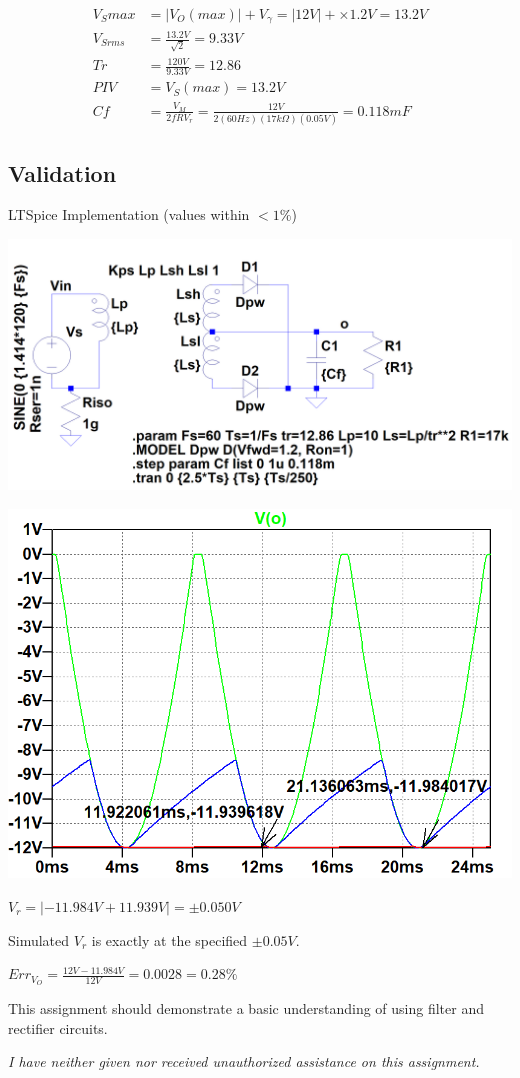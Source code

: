 \documentclass[12pt,letterpaper,titlepage]{article}
\begin{document}
\begin{raggedright}
\begin{align*}
    V_S{max} 
      &= |V_O(max)| + V_\gamma
       = |12V| + \times 1.2V
       = 13.2V
\\  V_{Srms}
	  &= \frac{13.2V}{\sqrt{2}}
	   = 9.33V
\\  Tr
	  &= \frac{120V}{9.33V}
	   = 12.86
\\  PIV
	  &= V_S(max)
	   = 13.2V
\\  Cf
      &= \frac{V_M}{2fRV_r}
       = \frac{12V}{2(60Hz)(17k\Omega)(0.05V)}
       = 0.118mF
\end{align*}


\clearpage
\subsection{Validation}

\begin{center}
LTSpice Implementation (values within $<1\%$)

\includegraphics[width=.75\textwidth, height=\textheight, keepaspectratio=true]{ds2b}

\includegraphics[width=.65\textwidth, height=\textheight, keepaspectratio=true]{ds2c}

$V_r = |-11.984V+11.939V| = \pm0.050V$

Simulated $V_r$ is exactly at the specified $\pm0.05V$. 

$Err_{V_O} = \frac{12V-11.984V}{12V} = 0.0028 = 0.28\%$
\end{center}

This assignment should demonstrate a basic understanding of using filter and rectifier circuits.

\textit{I have neither given nor received unauthorized assistance on this assignment.}


\end{raggedright}
\end{document}
